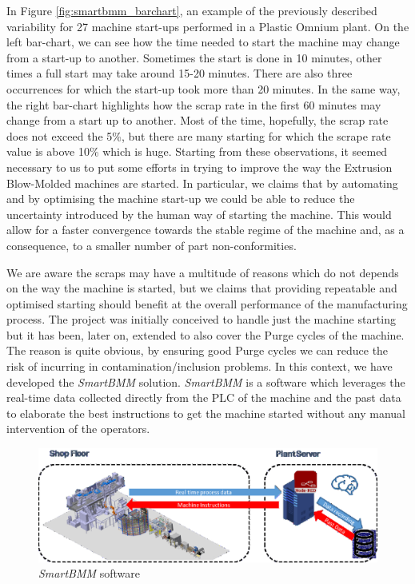 In Figure \ref{fig:smartbmm_barchart}, an example of the previously described variability for 27 machine start-ups performed in a Plastic Omnium plant. On the left bar-chart, we can see how the time needed to start the machine may change from a start-up to another. Sometimes the start is done in 10 minutes, other times a full start may take around 15-20 minutes. There are also three occurrences for which the start-up took more than 20 minutes. In the same way, the right bar-chart highlights how the scrap rate in the first 60 minutes may change from a start up to another. Most of the time, hopefully, the scrap rate does not exceed the 5\%, but there are many starting for which the scrape rate value is above 10\% which is huge. Starting from these observations, it seemed necessary to us to put some efforts in trying to improve the way the Extrusion Blow-Molded machines are started. In particular, we claims that by automating and by optimising the machine start-up we could be able to reduce the uncertainty introduced by the human way of starting the machine. This would allow for a faster convergence towards the stable regime of the machine and, as a consequence, to a smaller number of part non-conformities.   

We are aware the scraps may have a multitude of reasons which do not depends on the way the machine is started, but we claims that providing repeatable and optimised starting should benefit at the overall performance of the manufacturing process. 
The project was initially conceived to handle just the machine starting but it has been, later on, extended to also cover the Purge cycles of the machine. The reason is quite obvious, by ensuring good Purge cycles we can reduce the risk of incurring in contamination/inclusion problems. In this context, we have developed the \textit{SmartBMM} solution. \textit{SmartBMM} is a software which leverages the real-time data collected directly from the PLC of the machine and the past data to elaborate the best instructions to get the machine started without any manual intervention of the operators.

\begin{figure}
\centerline{\includegraphics[scale=1]{images/chapter_3/SmartBMM.eps}}
\caption{\textit{SmartBMM} software}
\label{fig:SmartBMM}
\end{figure}

